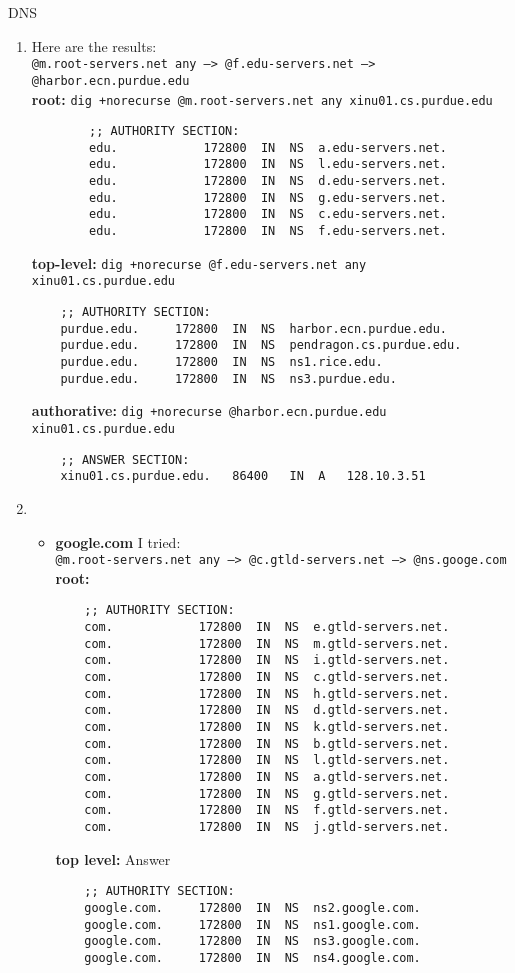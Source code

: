 \documentclass[11pt]{article}
\newenvironment{problem}[2][Problem]{\begin{trivlist}
\item[\hskip \labelsep {\bfseries #1}\hskip \labelsep {\bfseries #2.}]}{\end{trivlist}}
\begin{document}
\begin{problem}{2} DNS
\begin{enumerate}
	\item [a.] Here are the results:\\
	 \texttt{@m.root-servers.net any --> @f.edu-servers.net --> @harbor.ecn.purdue.edu}\\
	\textbf{root:} \texttt{dig +norecurse @m.root-servers.net any xinu01.cs.purdue.edu}
	\begin{verbatim}
	    ;; AUTHORITY SECTION:
	    edu.			172800	IN	NS	a.edu-servers.net.
	    edu.			172800	IN	NS	l.edu-servers.net.
	    edu.			172800	IN	NS	d.edu-servers.net.
	    edu.			172800	IN	NS	g.edu-servers.net.
	    edu.			172800	IN	NS	c.edu-servers.net.
	    edu.			172800	IN	NS	f.edu-servers.net.
	\end{verbatim}
	\textbf{top-level:}
	\texttt{dig +norecurse @f.edu-servers.net any xinu01.cs.purdue.edu}
	\begin{verbatim}
    ;; AUTHORITY SECTION:
    purdue.edu.		172800	IN	NS	harbor.ecn.purdue.edu.
    purdue.edu.		172800	IN	NS	pendragon.cs.purdue.edu.
    purdue.edu.		172800	IN	NS	ns1.rice.edu.
    purdue.edu.		172800	IN	NS	ns3.purdue.edu.
	\end{verbatim}
	\textbf{authorative:}
	\texttt{dig +norecurse @harbor.ecn.purdue.edu xinu01.cs.purdue.edu}
	\begin{verbatim}
    ;; ANSWER SECTION:
    xinu01.cs.purdue.edu.	86400	IN	A	128.10.3.51
	\end{verbatim}
	\item [b.]
	\begin{itemize}
		\item \textbf{google.com} I tried:\\
		 \texttt{@m.root-servers.net any --> @c.gtld-servers.net --> @ns.googe.com}\\
		 \textbf{root:}
		 \begin{verbatim}
    ;; AUTHORITY SECTION:
    com.			172800	IN	NS	e.gtld-servers.net.
    com.			172800	IN	NS	m.gtld-servers.net.
    com.			172800	IN	NS	i.gtld-servers.net.
    com.			172800	IN	NS	c.gtld-servers.net.
    com.			172800	IN	NS	h.gtld-servers.net.
    com.			172800	IN	NS	d.gtld-servers.net.
    com.			172800	IN	NS	k.gtld-servers.net.
    com.			172800	IN	NS	b.gtld-servers.net.
    com.			172800	IN	NS	l.gtld-servers.net.
    com.			172800	IN	NS	a.gtld-servers.net.
    com.			172800	IN	NS	g.gtld-servers.net.
    com.			172800	IN	NS	f.gtld-servers.net.
    com.			172800	IN	NS	j.gtld-servers.net.
		 \end{verbatim}
		 \textbf{top level:} Answer
		 \begin{verbatim}
    ;; AUTHORITY SECTION:
    google.com.		172800	IN	NS	ns2.google.com.
    google.com.		172800	IN	NS	ns1.google.com.
    google.com.		172800	IN	NS	ns3.google.com.
    google.com.		172800	IN	NS	ns4.google.com.
		 \end{verbatim}


\end{itemize}
\end{enumerate}
\end{problem}
\end{document}
